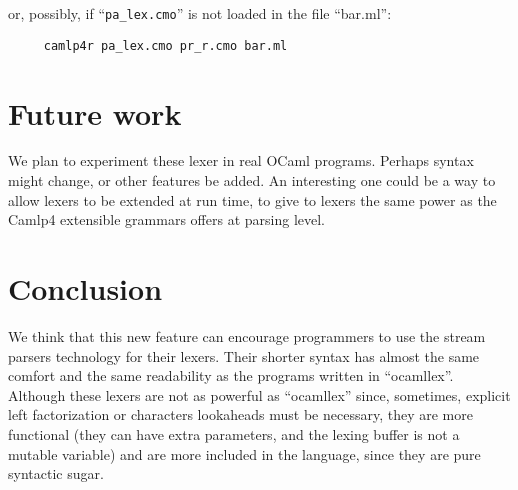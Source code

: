 \documentclass[11pt]{article}
\begin{document}
or, possibly, if ``\verb/pa_lex.cmo/'' is not loaded in the file ``bar.ml'':

\begin{verbatim}
     camlp4r pa_lex.cmo pr_r.cmo bar.ml
\end{verbatim}

\section{Future work}
\label{future}

We plan to experiment these lexer in real OCaml programs. Perhaps
syntax might change, or other features be added. An interesting one
could be a way to allow lexers to be extended at run time, to give to
lexers the same power as the Camlp4 extensible grammars offers at
parsing level.

\section{Conclusion}
\label{conclusion}

We think that this new feature can encourage programmers to use the
stream parsers technology for their lexers. Their shorter syntax has
almost the same comfort and the same readability as the programs
written in ``ocamllex''. Although these lexers are not as powerful as
``ocamllex'' since, sometimes, explicit left factorization or
characters lookaheads must be necessary, they are more functional
(they can have extra parameters, and the lexing buffer is not a
mutable variable) and are more included in the language, since they
are pure syntactic sugar.
\end{document}
